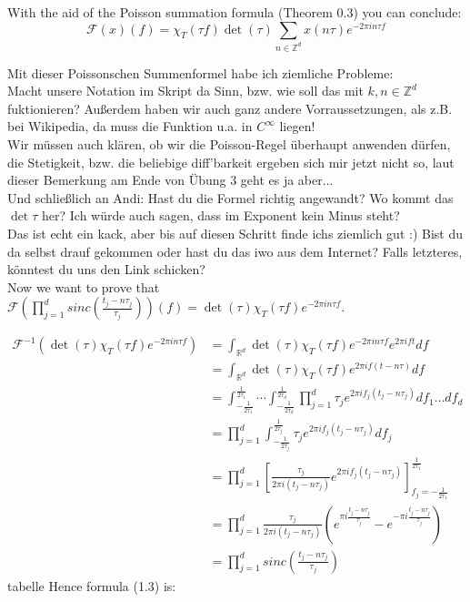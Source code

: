 \documentclass[a4paper, 11pt]{scrreprt}
\newcommand{\RR}{\mathbb{R}}
\newcommand{\ZZ}{\mathbb{Z}}
\newcommand{\FF}{\mathcal{F}}
\begin{document}
With the aid of the Poisson summation formula (Theorem 0.3) you can conclude:
\begin{equation}
\FF(x)(f) = \chi_{T}(\tau f) \det(\tau) \sum_{n \in \ZZ^d} x(n\tau)e^{-2\pi i n\tau f}
\end{equation}

Mit dieser Poissonschen Summenformel habe ich ziemliche Probleme:\\
Macht unsere Notation im Skript da Sinn, bzw. wie soll das mit \(k,n \in \ZZ^d\) fuktionieren? Außerdem haben wir auch ganz andere Vorraussetzungen, als z.B. bei Wikipedia, da muss die Funktion u.a. in \(C^{\infty}\) liegen! \\
Wir müssen auch klären, ob wir die Poisson-Regel überhaupt anwenden dürfen, die Stetigkeit, bzw. die beliebige diff'barkeit ergeben sich mir jetzt nicht so, laut dieser Bemerkung am Ende von Übung 3 geht es ja aber...\\
Und schließlich an Andi: Hast du die Formel richtig angewandt? Wo kommt das \(\det{\tau}\) her? Ich würde auch sagen, dass im Exponent kein Minus steht? \\
Das ist echt ein kack, aber bis auf diesen Schritt finde ichs ziemlich gut :) Bist du da selbst drauf gekommen oder hast du das iwo aus dem Internet? Falls letzteres, könntest du uns den Link schicken?\\


Now we want to prove that \(\FF\left( \prod_{j=1}^d sinc \left( \frac{t_j-n\tau_j}{\tau_j}\right)\right)(f) = \det(\tau)\chi_{T}(\tau f)e^{-2\pi in\tau f}\).

\begin{align*}
\FF^{-1}\left( \det(\tau) \chi_{T}(\tau f) e^{-2 \pi i n \tau f}\right) 
&= \int_{\RR^d} \det(\tau) \chi_{T}(\tau f) e^{-2 \pi i n \tau f} e^{2 \pi i f t} df \\
&= \int_{\RR^d} \det(\tau) \chi_{T}(\tau f) e^{2 \pi i f (t-n\tau) }df \\
&= \int_{-\frac{1}{2\tau_1}}^{\frac{1}{2\tau_1}} \cdots \int_{-\frac{1}{2\tau_d}}^{\frac{1}{2\tau_d}} \prod_{j=1}^d \tau_j e^{2 \pi i f_j(t_j-n \tau_j)}df_1 \ldots df_d \\
&= \prod_{j=1}^d \int_{-\frac{1}{2\tau_j}}^{\frac{1}{2\tau_j}} \tau_j e^{2 \pi i f_j (t_j - n \tau_j)}df_j \\
&= \prod_{j=1}^d \left[  \frac{\tau_j}{2 \pi i (t_j - n \tau_j)} e^{2 \pi i f_j (t_j - n \tau_j)} \right]_{f_j = -\frac{1}{2\tau_1}}^{\frac{1}{2\tau_1}} \\
&= \prod_{j=1}^d \frac{\tau_j}{2 \pi i (t_j - n \tau_j)} \left( e^{\pi i \frac{t_j - n \tau_j}{\tau_j}} - e^{-\pi i \frac{t_j - n \tau_j}{\tau_j}} \right) \\
&= \prod_{j=1}^d sinc \left( \frac{t_j - n \tau_j}{\tau_j} \right)
\end{align*}
tabelle
Hence formula (1.3) is:
\end{document}
